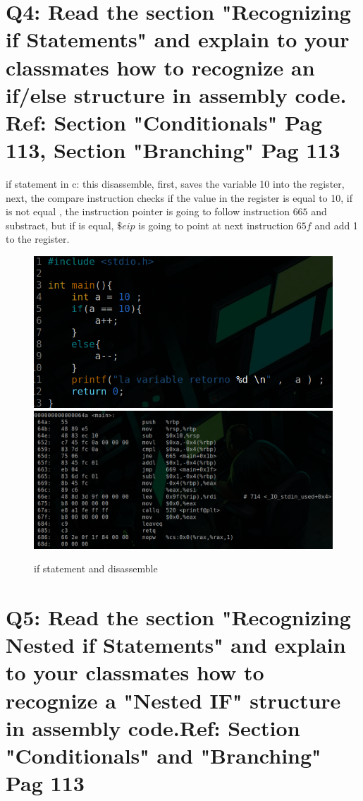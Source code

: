 \documentclass[10pt,a4paper]{article} %
\begin{document}
    \newpage
    \section{Q4: Read the section "Recognizing if Statements" and explain to
        your classmates how to recognize an if/else structure in assembly code.
        Ref: Section "Conditionals" Pag 113, Section "Branching" Pag 113}

        if statement in c:
        this disassemble, first, saves the variable 10 into the register, next,
        the compare instruction checks if the value in the register is equal to
        10, if is not equal , the instruction pointer is going to follow
        instruction $ 665  $ and substract, but if is equal, $ \$eip  $ is
        going to point at next instruction $ 65f  $ and add 1 to the register.
        \begin{figure}[h!]
            \centering
            \includegraphics[width=0.9\linewidth]{ifcode.png}
            \includegraphics[width=0.9\linewidth]{ifdis.png}
            \caption{if statement and disassemble}
            \label{if}
        \end{figure}


    \newpage
    \section{Q5: Read the section "Recognizing Nested if Statements" and
        explain to your classmates how to recognize a "Nested IF" structure in
        assembly code.Ref: Section "Conditionals" and "Branching" Pag 113}
\end{document}
